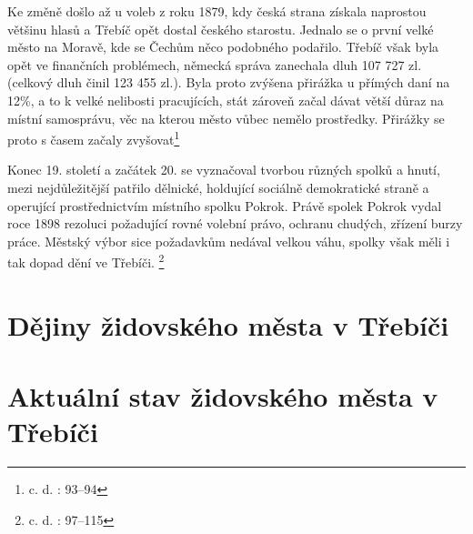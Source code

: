 \documentclass[a4paper,oneside,12p]{report}
\let\openright=\clearpage
\begin{document}
Ke změně došlo až u voleb z roku 1879, kdy česká strana získala naprostou většinu hlasů a Třebíč opět dostal českého starostu.
Jednalo se o první velké město na Moravě, kde se Čechům něco podobného podařilo.
Třebíč však byla opět ve finančních problémech, německá správa zanechala dluh 107 727 zl. (celkový dluh činil 123 455 zl.).
Byla proto zvýšena přirážka u přímých daní na 12\%, a to k velké nelibosti pracujících, stát zároveň začal dávat větší důraz na místní samosprávu, věc na kterou město vůbec nemělo prostředky.
Přirážky se proto s časem začaly zvyšovat\footnote{c. d. : 93--94}

Konec 19. století a začátek 20. se vyznačoval tvorbou různých spolků a hnutí, mezi nejdůležitější patřilo dělnické, holdující sociálně demokratické straně a operující prostřednictvím místního spolku Pokrok.
Právě spolek Pokrok vydal roce 1898 rezoluci požadující rovné volební právo, ochranu chudých, zřízení burzy práce.
Městský výbor sice požadavkům nedával velkou váhu, spolky však měli i tak dopad dění ve Třebíči. \footnote{c. d. : 97--115}


\chapter{Dějiny židovského města v Třebíči}

\chapter{Aktuální stav židovského města v Třebíči}





\listoffigures
\openright
\end{document}
